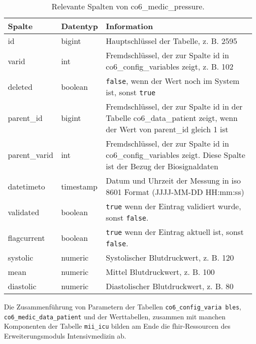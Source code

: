 \begin{longtable}{|l|l|p{8cm}|}
	\caption[Relevante Spalten von co6\_medic\_pressure]{Relevante Spalten von co6\_medic\_pressure.}
	\label{tab:valuepress}
	\endfirsthead
		\hline
		\bfseries Spalte & \bfseries Datentyp & \bfseries Information \\ \hline
		id & bigint & Hauptschlüssel der Tabelle, z. B. 2595 \\ \hline
		varid & int & Fremdschlüssel, der zur Spalte id in co6\_config\_variables zeigt, z. B. 102 \\ \hline
		deleted & boolean & \texttt{false}, wenn der Wert noch im System ist, sonst \texttt{true} \\ \hline
		parent\_id & bigint & Fremdschlüssel, der zur Spalte id in der Tabelle co6\_data\_patient zeigt, wenn der Wert von parent\_id gleich 1 ist \\ \hline
		parent\_varid & int & Fremdschlüssel, der zur Spalte id in co6\_config\_variables zeigt. Diese Spalte ist der Bezug der Biosignaldaten \\ \hline
		datetimeto & timestamp & Datum und Uhrzeit der Messung in \acs{iso} 8601 Format (JJJJ-MM-DD HH:mm:ss)\\ \hline
		validated & boolean & \texttt{true} wenn der Eintrag validiert wurde, sonst \texttt{false}. \\ \hline
		flagcurrent & boolean & \texttt{true} wenn der Eintrag aktuell ist, sonst \texttt{false}. \\ \hline
		systolic & numeric & Systolischer Blutdruckwert, z. B. 120 \\ \hline
		mean & numeric & Mittel Blutdruckwert, z. B. 100 \\ \hline
		diastolic & numeric & Diastolischer Blutdruckwert, z. B. 80 \\ \hline
\end{longtable}

\newpage

Die Zusammenführung von Parametern der Tabellen \texttt{co6\_config\_varia bles}, \texttt{co6\_medic\_data\_patient} und der Werttabellen, zusammen mit manchen Komponenten der Tabelle \texttt{mii\_icu} bilden am Ende die \ac{fhir}-Ressourcen des Erweiterungsmoduls \glqq Intensivmedizin\grqq{} ab.